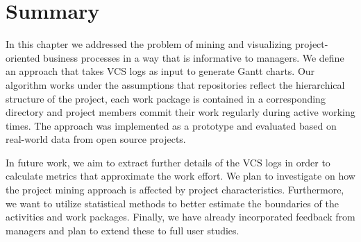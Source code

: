 \section{Summary}
\label{sec:bpm2015outro}

In this chapter we
addressed the problem of mining and visualizing project-oriented business processes in a way that is informative to managers. We define an approach that takes VCS logs as input to generate Gantt charts.
Our algorithm works under the assumptions that repositories reflect the hierarchical structure of the project, each work package is contained in a corresponding directory and project members commit their work regularly during active working times.
The approach was implemented as a prototype and evaluated based on real-world data from open source projects.

In future work, we aim to extract further details of the VCS logs in order to calculate metrics that approximate the work effort. %
We plan to investigate on how the project mining approach is affected by project characteristics. Furthermore, we want to utilize statistical methods to better estimate the boundaries of the activities and work packages. Finally, we have already incorporated feedback from managers and plan to extend these to full user studies.

